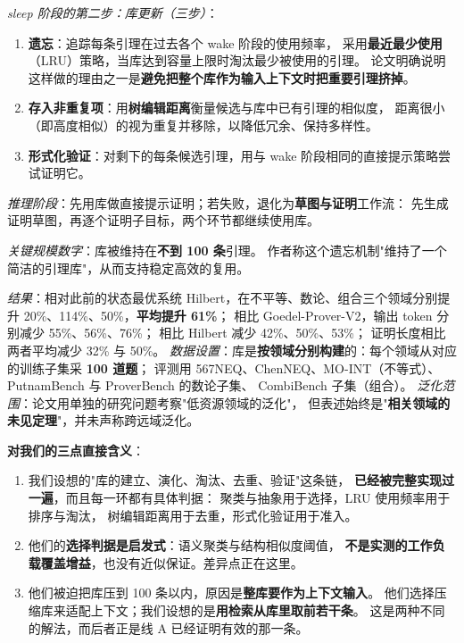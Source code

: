 \documentclass[UTF8,a4paper,11pt,fontset=windows]{ctexart}
\newcommand{\field}[1]{\textit{#1}：}
\begin{document}
\field{sleep 阶段的第二步：库更新（三步）}
\begin{enumerate}[leftmargin=1.5em,itemsep=2pt]
  \item \textbf{遗忘}：追踪每条引理在过去各个 wake 阶段的使用频率，
        采用\textbf{最近最少使用}（LRU）策略，当库达到容量上限时淘汰最少被使用的引理。
        论文明确说明这样做的理由之一是\textbf{避免把整个库作为输入上下文时把重要引理挤掉}。
  \item \textbf{存入非重复项}：用\textbf{树编辑距离}衡量候选与库中已有引理的相似度，
        距离很小（即高度相似）的视为重复并移除，以降低冗余、保持多样性。
  \item \textbf{形式化验证}：对剩下的每条候选引理，用与 wake 阶段相同的直接提示策略尝试证明它。
\end{enumerate}

\field{推理阶段}先用库做直接提示证明；若失败，退化为\textbf{草图与证明}工作流：
先生成证明草图，再逐个证明子目标，两个环节都继续使用库。

\field{关键规模数字}库被维持在\textbf{不到 100 条}引理。
作者称这个遗忘机制"维持了一个简洁的引理库"，从而支持稳定高效的复用。

\field{结果}相对此前的状态最优系统 Hilbert，在不平等、数论、组合三个领域分别提升
20\%、114\%、50\%，\textbf{平均提升 61\%}；
相比 Goedel-Prover-V2，输出 token 分别减少 55\%、56\%、76\%；
相比 Hilbert 减少 42\%、50\%、53\%；
证明长度相比两者平均减少 32\% 与 50\%。
\field{数据设置}库是\textbf{按领域分别构建}的：每个领域从对应的训练子集采 \textbf{100 道题}；
评测用 567NEQ、ChenNEQ、MO-INT（不等式）、PutnamBench 与 ProverBench 的数论子集、
CombiBench 子集（组合）。
\field{泛化范围}论文用单独的研究问题考察"低资源领域的泛化"，
但表述始终是"\textbf{相关领域的未见定理}"，并未声称跨远域泛化。

\begin{warnbox}
\textbf{对我们的三点直接含义}：
\begin{enumerate}[leftmargin=1.5em,itemsep=2pt,topsep=2pt]
  \item 我们设想的"库的建立、演化、淘汰、去重、验证"这条链，
        \textbf{已经被完整实现过一遍}，而且每一环都有具体判据：
        聚类与抽象用于选择，LRU 使用频率用于排序与淘汰，
        树编辑距离用于去重，形式化验证用于准入。
  \item 他们的\textbf{选择判据是启发式}：语义聚类与结构相似度阈值，
        \textbf{不是实测的工作负载覆盖增益}，也没有近似保证。差异点正在这里。
  \item 他们被迫把库压到 100 条以内，原因是\textbf{整库要作为上下文输入}。
        他们选择压缩库来适配上下文；我们设想的是\textbf{用检索从库里取前若干条}。
        这是两种不同的解法，而后者正是线 A 已经证明有效的那一条。
\end{enumerate}
\end{warnbox}
\end{document}
